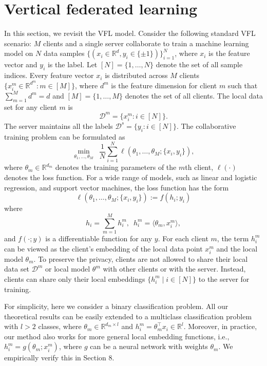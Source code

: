 \section{Vertical federated learning} \label{sec:8-3}
In this section, we revisit the VFL model. Consider the following standard VFL scenario: $M$ clients and a single server collaborate to train a machine learning model on $N$ data samples $\{(x_i \in \mathbb{R}^d, y_i \in \{\pm 1\})\}_{i=1}^N$, where $x_i$ is the feature vector and $y_i$ is the label. Let $[N] = \{1, \dots, N\}$ denote the set of all sample indices. 
Every feature vector $x_i$ is distributed across $M$ clients $\{x^m_i\in\mathbb{R}^{d^m}: m \in [M]\}$, where $d^m$ is the feature dimension for client $m$ such that $\sum_{m=1}^M d^m = d$ and $[M] = \{1,\dots, M\}$ denotes the set of all clients. The local data set for any client $m$ is
\[\mathcal{D}^m = \{x_i^m : i \in [N]\}.\]
The server maintains all the labels $\mathcal{D}^s = \{y_i: i \in [N]\}$. 
The collaborative training problem can be formulated as
\begin{equation} \label{eq:main_prob3}
    \min_{\theta_1, \dots, \theta_M} \enspace \frac{1}{N}\sum_{i=1}^N \ell\left(\theta_1, \dots, \theta_M; \{x_i, y_i\} \right),
\end{equation}
where $\theta_m \in \mathbb{R}^{d_m}$ denotes the training parameters of the $m$th client, $\ell(\cdot)$ denotes the loss function. For a wide range of models, such as linear and logistic regression, and support vector machines, the loss function has the form
\begin{equation} \label{eq:loss_function}
     \ell\left(\theta_1, \dots, \theta_M; \{x_i, y_i\} \right) 
     := 
     f\left( h_i; y_i\right)
\end{equation}
where 
\[h_i = \sum_{m=1}^M h_i^m, \enspace h_i^m = \langle \theta_m, x_i^m \rangle,\]
and $f(\cdot; y)$ is a differentiable function for any $y$. For each client $m$, the term $h_i^m$ can be viewed as the client's embedding of the local data point $x_i^m$ and the local model $\theta_m$. To preserve the privacy, clients are not allowed to share their local data set $\mathcal{D}^m$ or local model $\theta^m$ with other clients or with the server. Instead, clients can share only their local embeddings $\{h_i^m\mid i\in[N]\}$ to the server for training. 

For simplicity, here we consider a binary classification problem. All our theoretical results can be easily extended to a multiclass classification problem with $l > 2$ classes, where $\theta_m \in \mathbb{R}^{d_m \times l}$ and $h_i^m = \theta_m^\intercal x_i \in \mathbb{R}^l$. Moreover, in practice, our method also works for more general local embedding functions, i.e., $h_i^m = g(\theta_m; x_i^m)$, where $g$ can be a neural network with weights $\theta_m$. We empirically verify this in Section 8.

